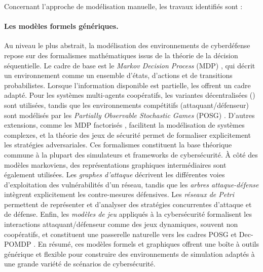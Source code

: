 Concernant l'approche de modélisation manuelle, les travaux identifiés sont :

\paragraph{Les modèles formels génériques.}
Au niveau le plus abstrait, la modélisation des environnements de cyberdéfense repose sur des formalismes mathématiques issus de la théorie de la décision séquentielle. Le cadre de base est le \textit{Markov Decision Process} (MDP) \cite{puterman1994mdp}, qui décrit un environnement comme un ensemble d’états, d’actions et de transitions probabilistes. Lorsque l’information disponible est partielle, les  \cite{kaelbling1998pomdp} offrent un cadre adapté. Pour les systèmes multi-agents coopératifs, les variantes décentralisées () \cite{Oliehoek2016} sont utilisées, tandis que les environnements compétitifs (attaquant/défenseur) sont modélisés par les \textit{Partially Observable Stochastic Games} (POSG) \cite{hansen2004posg}. D’autres extensions, comme les MDP factorisés \cite{guestrin2003factored}, facilitent la modélisation de systèmes complexes, et la théorie des jeux de sécurité \cite{manshaei2013game} permet de formaliser explicitement les stratégies adversariales.
Ces formalismes constituent la base théorique commune à la plupart des simulateurs et frameworks de cybersécurité. À côté des modèles markoviens, des représentations graphiques intermédiaires sont également utilisées. Les \textit{graphes d’attaque} \cite{CPhilips1998} décrivent les différentes voies d’exploitation des vulnérabilités d’un réseau, tandis que les \textit{arbres attaque-défense} \cite{BKordy2010} intègrent explicitement les contre-mesures défensives. Les \textit{réseaux de Petri} \cite{MPetty2022,JBland2020,SYamaguchi2020} permettent de représenter et d’analyser des stratégies concurrentes d’attaque et de défense. Enfin, les \textit{modèles de jeu} appliqués à la cybersécurité \cite{MPanfili2018,AAttiah2018,CXiaolin2008} formalisent les interactions attaquant/défenseur comme des jeux dynamiques, souvent non coopératifs, et constituent une passerelle naturelle vers les cadres POSG et Dec-POMDP \cite{beynier2010,terry2020pettingzoo,bernstein2013}.
En résumé, ces modèles formels et graphiques offrent une boîte à outils générique et flexible pour construire des environnements de simulation adaptés à une grande variété de scénarios de cybersécurité.

